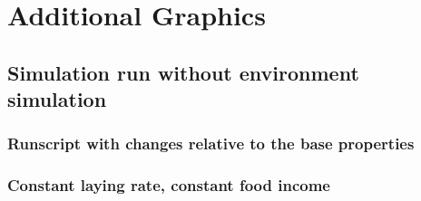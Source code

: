 \section{Additional Graphics}
\subsection{Simulation run without environment simulation}
	\subsubsection{Runscript with changes relative to the base properties}
		
	\subsubsection{Constant laying rate, constant food income}
		\label{chap:sim_R0_1}

